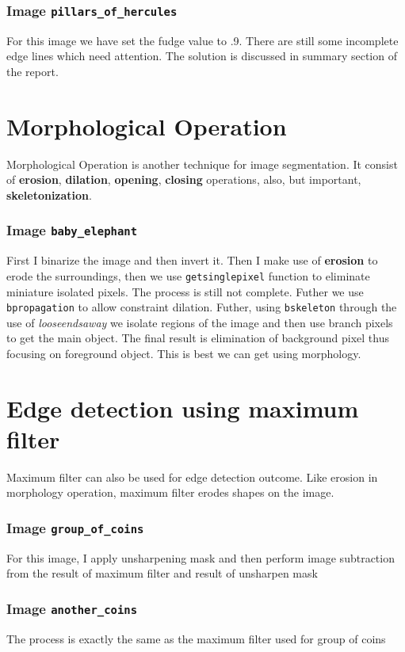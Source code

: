 \subsection{Image \texttt{pillars\_of\_hercules}}
For this image we have set the fudge value to .9. There are still some incomplete edge lines which need attention. The solution is discussed in summary section of the report.

\chapter{Morphological Operation}
Morphological Operation is another technique for image segmentation. It consist of \textbf{erosion}, \textbf{dilation}, \textbf{opening}, \textbf{closing} operations, also, but important, \textbf{skeletonization}.

\subsection{Image \texttt{baby\_elephant}}
First I binarize the image and then invert it. Then I make use of \textbf{erosion} to erode the surroundings, then we use \texttt{getsinglepixel} function to eliminate miniature isolated pixels. The process is still not complete. Futher we use \texttt{bpropagation} to allow constraint dilation. Futher, using \texttt{bskeleton} through the use of \textit{looseendsaway} we isolate regions of the image and then use branch pixels to get the main object. The final result is elimination of background pixel thus focusing on foreground object. This is best we can get using morphology.
\chapter{Edge detection using maximum filter}
Maximum filter can also be used for edge detection outcome. Like erosion in morphology operation, maximum filter erodes shapes on the image.

\subsection{Image \texttt{group\_of\_coins}}
For this image, I apply unsharpening mask and then perform image subtraction from the result of maximum filter and result of unsharpen mask

\subsection{Image \texttt{another\_coins}}
The process is exactly the same as the maximum filter used for group of coins
